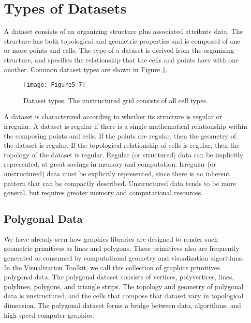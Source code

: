 \section{Types of Datasets}

A dataset consists of an organizing structure plus associated attribute data. The structure has both topological and geometric properties and is composed of one or more points and cells. The type of a dataset is derived from the organizing structure, and specifies the relationship that the cells and points have with one another. Common dataset types are shown in Figure \ref{fig:Figure5-7}.

\begin{figure}[!htb]
	\centering
	\texttt{[image: Figure5-7]}
	\caption{Dataset types. The unstructured grid consists of all cell types.}
	\label{fig:Figure5-7}
\end{figure}

A dataset is characterized according to whether its structure is regular or irregular. A dataset is regular if there is a single mathematical relationship within the composing points and cells. If the points are regular, then the geometry of the dataset is regular. If the topological relationship of cells is regular, then the topology of the dataset is regular. Regular (or structured) data can be implicitly represented, at great savings in memory and computation. Irregular (or unstructured) data must be explicitly represented, since there is no inherent pattern that can be compactly described. Unstructured data tends to be more general, but requires greater memory and computational resources.

\subsection{Polygonal Data}

We have already seen how graphics libraries are designed to render such geometric primitives as lines and polygons. These primitives also are frequently generated or consumed by computational geometry and visualization algorithms. In the Visualization Toolkit, we call this collection of graphics primitives polygonal data. The polygonal dataset consists of vertices, polyvertices, lines, polylines, polygons, and triangle strips. The topology and geometry of polygonal data is unstructured, and the cells that compose that dataset vary in topological dimension. The polygonal dataset forms a bridge between data, algorithms, and high-speed computer graphics.

